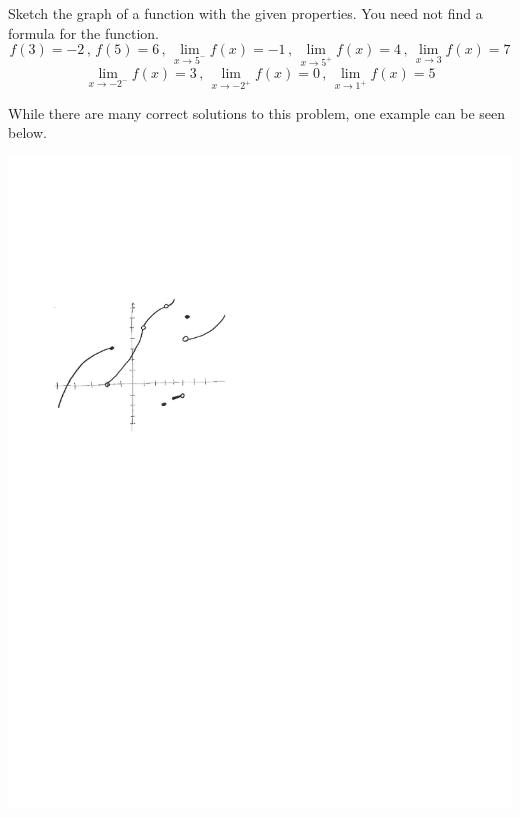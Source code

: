 \documentclass[handout,nooutcomes]{ximera}
\begin{document}
\begin{problem}
\begin{freeResponse}
	\end{freeResponse}
	
\end{problem}
			
			
			

\begin{problem}
Sketch the graph of a function with the given properties.  You need not find a formula for the function.
	$$ f(3) = -2 \, , \, f(5) = 6 \, , \, \lim_{x \to 5^-} f(x) = -1 \, , \,   \lim_{x \to 5^+} f(x) = 4 \, , \,  \lim_{x \to 3} f(x) = 7 $$
	$$  \lim_{x \to -2^-} f(x) = 3 \, , \,  \lim_{x \to -2^+} f(x) = 0 \, , \,  \lim_{x \to 1^+} f(x) = 5  $$
	\begin{freeResponse}
	While there are many correct solutions to this problem, one example can be seen below.
	
		\begin{image}
		\includegraphics[trim= 70 470 250 160]{Figure4.pdf}
		\end{image}
	\end{freeResponse}
\end{problem}
	
\end{document}

